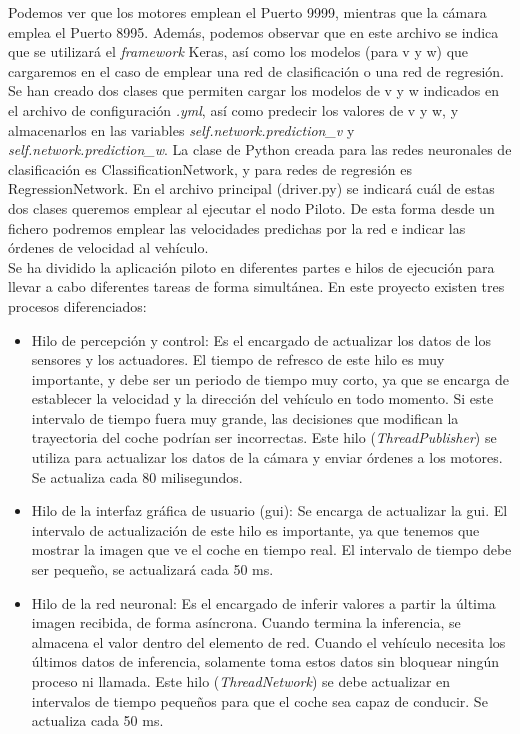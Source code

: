 Podemos ver que los motores emplean el Puerto 9999, mientras que la cámara emplea el Puerto 8995. Además, podemos observar que en este archivo se indica que se utilizará el \textit{framework} Keras, así como los modelos (para v y w) que cargaremos en el caso de emplear una red de clasificación o una red de regresión.\\

Se han creado dos clases que permiten cargar los modelos de v y w indicados en el archivo de configuración \textit{.yml}, así como predecir los valores de v y w, y almacenarlos en las variables \textit{self.network.prediction\_v} y \textit{self.network.prediction\_w}. La clase de Python creada para las redes neuronales de clasificación es ClassificationNetwork, y para redes de regresión es RegressionNetwork. En el archivo principal (driver.py) se indicará cuál de estas dos clases queremos emplear al ejecutar el nodo Piloto. De esta forma desde un fichero podremos emplear las velocidades predichas por la red e indicar las órdenes de velocidad al vehículo.\\

Se ha dividido la aplicación piloto en diferentes partes e hilos de ejecución para llevar a cabo diferentes tareas de forma simultánea. En este proyecto existen tres procesos diferenciados:

\begin{itemize}
    \item Hilo de percepción y control: Es el encargado de actualizar los datos de los sensores y los actuadores. El tiempo de refresco de este hilo es muy importante, y debe ser un periodo de tiempo muy corto, ya que se encarga de establecer la velocidad y la dirección del vehículo en todo momento. Si este intervalo de tiempo fuera muy grande, las decisiones que modifican la trayectoria del coche podrían ser incorrectas. Este hilo (\textit{ThreadPublisher}) se utiliza para actualizar los datos de la cámara y enviar órdenes a los motores. Se actualiza cada 80 milisegundos.
    
    \item Hilo de la interfaz gráfica de usuario (\acrshort{gui}): Se encarga de actualizar la \acrshort{gui}. El intervalo de actualización de este hilo es importante, ya que tenemos que mostrar la imagen que ve el coche en tiempo real. El intervalo de tiempo debe ser pequeño, se actualizará cada 50 ms.
    
    \item Hilo de la red neuronal: Es el encargado de inferir valores a partir la última imagen recibida, de forma asíncrona. Cuando termina la inferencia, se almacena el valor dentro del elemento de red. Cuando el vehículo necesita los últimos datos de inferencia, solamente toma estos datos sin bloquear ningún proceso ni llamada. Este hilo (\textit{ThreadNetwork}) se debe actualizar en intervalos de tiempo pequeños para que el coche sea capaz de conducir. Se actualiza cada 50 ms.

\end{itemize}

